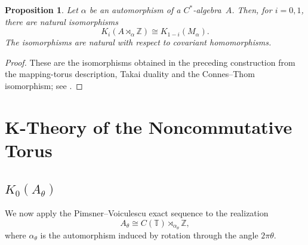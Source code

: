 \documentclass{book}
\newtheorem{proposition}[definition]{Proposition}
\def\cstar{\(C^*\)-algebra}
\begin{document}
\begin{proposition}
  Let \(\alpha\) be an automorphism of a \cstar\ \(A\). Then, for
  \(i=0,1\), there are natural isomorphisms
  \[
    K_i(A\rtimes_\alpha\mathbb Z)
    \cong
    K_{1-i}(M_\alpha).
  \]
  The isomorphisms are natural with respect to covariant homomorphisms.
\end{proposition}
\begin{proof}
  These are the isomorphisms obtained in the preceding construction from the
  mapping-torus description, Takai duality and the Connes--Thom isomorphism;
  see \cite[Proposition~10.4.3]{Blackadar1998}.
\end{proof}



\chapter{K-Theory of the Noncommutative Torus}

\section{\texorpdfstring{\(K_0(A_\theta)\)}{K0(A theta)}}

We now apply the Pimsner--Voiculescu exact sequence to the realization
\[
  A_\theta\cong C(\mathbb{T})\rtimes_{\alpha_\theta}\mathbb{Z},
\]
where \(\alpha_\theta\) is the automorphism induced by rotation through
the angle \(2\pi\theta\).
\end{document}
